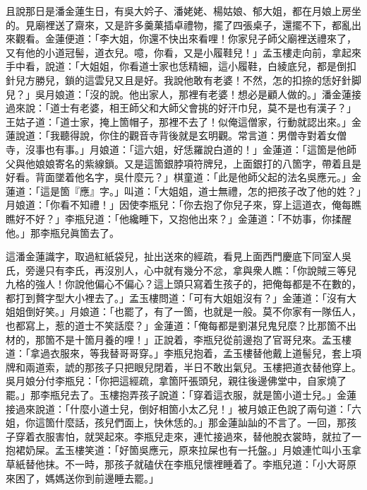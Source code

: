 且說那日是潘金蓮生日，有吳大妗子、潘姥姥、楊姑娘、郁大姐，都在月娘上房坐的。見廟裡送了齋來，又是許多羹菓插卓禮物，擺了四張桌子，還擺不下，都亂出來觀看。金蓮便道：「李大姐，你還不快出來看哩！你家兒子師父廟裡送禮來了，又有他的小道冠髻，道衣兒。噫，{}你看，又是小履鞋兒！」孟玉樓走向前，拿起來手中看，說道：「大姐姐，你看道士家也恁精細，這小履鞋，白綾底兒，都是倒扣針兒方勝兒，鎖的這雲兒又且是好。我說他敢有老婆！不然，怎的扣捺的恁好針脚兒？」吳月娘道：「沒的說。他出家人，那裡有老婆！{}想必是顧人做的。」潘金蓮接過來說：「道士有老婆，相王師父和大師父會挑的好汗巾兒，莫不是也有漢子？」{}王姑子道：「道士家，掩上箇帽子，那裡不去了！似俺這僧家，行動就認出來。」{}金蓮說道：「我聽得說，你住的觀音寺背後就是玄明觀。常言道：男僧寺對着女僧寺，沒事也有事。」月娘道：「這六姐，好恁羅說白道的！」金蓮道：「這箇是他師父與他娘娘寄名的紫線鎖。又是這箇銀脖項符牌兒，上面銀打的八箇字，帶着且是好看。背面墜着他名字，吳什麼元？」棋童道：「此是他師父起的法名吳應元。」金蓮道：「這是箇『應』字。」{}叫道：「大姐姐，道士無禮，怎的把孩子改了他的姓？」{}月娘道：「你看不知禮！」因使李瓶兒：「你去抱了你兒子來，穿上這道衣，俺每瞧瞧好不好？」李瓶兒道：「他纔睡下，又抱他出來？」金蓮道：「不妨事，你揉醒他。」那李瓶兒眞箇去了。

這潘金蓮識字，取過紅紙袋兒，扯出送來的經疏，看見上面西門慶底下同室人吳氏，旁邊只有李氏，再沒別人，心中就有幾分不忿，拿與衆人瞧：「你說賊三等兒九格的強人！你說他偏心不偏心？這上頭只寫着生孩子的，把俺每都是不在數的，都打到贅字型大小裡去了。」孟玉樓問道：「可有大姐姐沒有？」金蓮道：「沒有大姐姐倒好笑。」{}{}月娘道：「也罷了，有了一箇，也就是一般。莫不你家有一隊伍人，也都寫上，惹的道士不笑話麼？」金蓮道：「俺每都是劉湛兒鬼兒麼？比那箇不出材的，那箇不是十箇月養的哩！」正說着，李瓶兒從前邊抱了官哥兒來。孟玉樓道：「拿過衣服來，等我替哥哥穿。」李瓶兒抱着，孟玉樓替他戴上道髻兒，套上項牌和兩道索，諕的那孩子只把眼兒閉着，半日不敢出氣兒。玉樓把道衣替他穿上。吳月娘分付李瓶兒：「你把這經疏，拿箇阡張頭兒，親往後邊佛堂中，自家燒了罷。」那李瓶兒去了。玉樓抱弄孩子說道：「穿着這衣服，就是箇小道士兒。」金蓮接過來說道：「什麼小道士兒，倒好相箇小太乙兒！」被月娘正色說了兩句道：「六姐，你這箇什麼話，孩兒們面上，快休恁的。」那金蓮訕訕的不言了。{}一回，那孩子穿着衣服害怕，就哭起來。李瓶兒走來，連忙接過來，替他脫衣裳時，就拉了一抱裙奶屎。孟玉樓笑道：「好箇吳應元，原來拉屎也有一托盤。」月娘連忙叫小玉拿草紙替他抹。不一時，那孩子就磕伏在李瓶兒懷裡睡着了。李瓶兒道：「小大哥原來困了，媽媽送你到前邊睡去罷。」

